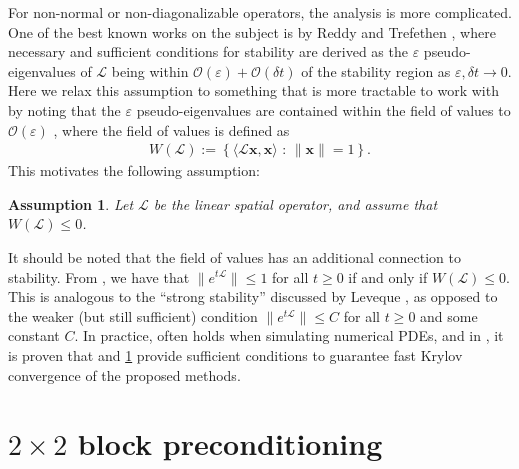 \documentclass[a4paper,10pt]{article}
\newtheorem{assumption}{Assumption}
\begin{document}
For non-normal or non-diagonalizable operators, the analysis is more complicated.
One of the best known works on the subject is by Reddy and Trefethen \cite{reddy92},
where necessary and sufficient conditions for stability are derived as the
$\varepsilon$ pseudo-eigenvalues of $\mathcal{L}$ being within
$\mathcal{O}(\varepsilon) + \mathcal{O}(\delta t)$ of the stability region
as $\varepsilon,\delta t\to 0$. Here we relax this assumption to something
that is more tractable to work with by noting that the $\varepsilon$
pseudo-eigenvalues are contained within the field of values to
$\mathcal{O}(\varepsilon)$ \cite[Eq. (17.9)]{trefethen2005spectra},
where the field of values is defined as
%
\begin{align}\label{eq:fov}
W(\mathcal{L}) := \left\{ \langle \mathcal{L}\mathbf{x},\mathbf{x}\rangle \text{ : }
	\|\mathbf{x}\| = 1 \right\}.
\end{align}
%
This motivates the following assumption:
%
\begin{assumption}\label{ass:fov}
Let $\mathcal{L}$ be the linear spatial operator, and assume that $W(\mathcal{L}) \leq 0$.
\end{assumption}
%
It should be noted that the field of values has an additional connection
to stability. From \cite[Theorem 17.1]{trefethen2005spectra}, we have that
$\|e^{t\mathcal{L}}\|\leq 1$ for all $t\geq 0$ if and only if $W(\mathcal{L}) \leq 0$.
This is analogous to the ``strong stability'' discussed by Leveque
\cite[Chapter 9.5]{leveque2007finite}, as opposed to the weaker (but still
sufficient) condition $\|e^{t\mathcal{L}}\|\leq C$ for all $t\geq 0$ and
some constant $C$. In practice,  often holds when
simulating numerical PDEs, and in , it is proven that
 and \ref{ass:fov} provide sufficient conditions to guarantee
fast Krylov convergence of the proposed methods.

\section{$2\times 2$ block preconditioning}
\end{document}
